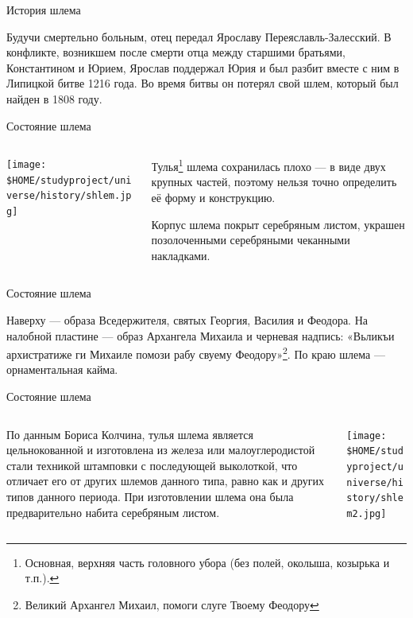 \begin{frame}{История шлема}

	Будучи смертельно больным, отец передал Ярославу Переяславль-Залесский. В конфликте, возникшем после смерти отца между старшими братьями, Константином и Юрием, Ярослав поддержал Юрия и был разбит вместе с ним в Липицкой битве 1216 года. Во время битвы он потерял свой шлем, который был найден в 1808 году.

\end{frame}
\begin{frame}{Состояние шлема}
	\begin{columns}
		\begin{column}{0.45\textwidth}
			\texttt{[image: \$HOME/studyproject/universe/history/shlem.jpg]}
		\end{column}
		\begin{column}{0.45\textwidth}

			Тулья\footnote{Основная, верхняя часть головного убора (без полей, околыша, козырька и т.п.).} шлема сохранилась плохо — в виде двух крупных частей, поэтому нельзя точно определить её форму и конструкцию.

			Корпус шлема покрыт серебряным листом, украшен позолоченными серебряными чеканными накладками.

		\end{column}
	\end{columns}
\end{frame}
\begin{frame}{Состояние шлема}

	Наверху — образа Вседержителя, святых Георгия, Василия и Феодора. На налобной пластине — образ Архангела Михаила и черневая надпись: «Вьликъи архистратиже ги Михаиле помози рабу свуему Феодору»\footnote{Великий Архангел Михаил, помоги слуге Твоему Феодору}. По краю шлема — орнаментальная кайма.

\end{frame}
\begin{frame}{Состояние шлема}
	\begin{columns}
		\begin{column}{0.45\textwidth}

	По данным Бориса Колчина, тулья шлема является цельнокованной и изготовлена из железа или малоуглеродистой стали техникой штамповки с последующей выколоткой, что отличает его от других шлемов данного типа, равно как и других типов данного периода. При изготовлении шлема она была предварительно набита серебряным листом.

		\end{column}
		\begin{column}{0.45\textwidth}

			\texttt{[image: \$HOME/studyproject/universe/history/shlem2.jpg]}

		\end{column}
	\end{columns}
\end{frame}
